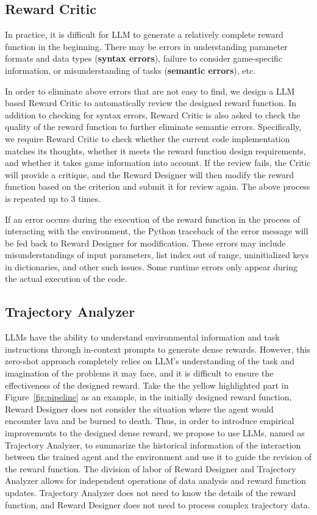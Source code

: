 \subsection{Reward Critic}
In practice, it is difficult for LLM to generate a relatively complete reward function in the beginning. There may be errors in understanding parameter formats and data types (\textbf{syntax errors}), failure to consider game-specific information, or misunderstanding of tasks (\textbf{semantic errors}), etc. 

In order to eliminate above errors that are not easy to find, we design a LLM based Reward Critic to automatically review the designed reward function. In addition to checking for syntax errors, Reward Critic is also asked to check the quality of the reward function to further eliminate semantic errors. Specifically, we require Reward Critic to check whether the current code implementation matches its thoughts, whether it meets the reward function design requirements, and whether it takes game information into account. If the review fails, the Critic will provide a critique, and the Reward Designer will then modify the reward function based on the criterion and submit it for review again. The above process is repeated up to 3 times.

If an error occurs during the execution of the reward function in the process of interacting with the environment, the Python traceback of the error message will be fed back to Reward Designer for modification. These errors may include misunderstandings of input parameters, list index out of range, uninitialized keys in dictionaries, and other such issues. Some runtime errors only appear during the actual execution of the code.


\subsection{Trajectory Analyzer}\label{sec:trajectory_analyzer}
LLMs have the ability to understand environmental information and task instructions through in-context prompts to generate dense rewards. However, this zero-shot approach completely relies on LLM’s understanding of the task and imagination of the problems it may face, and it is difficult to ensure the effectiveness of the designed reward. Take the the yellow highlighted part in Figure~\ref{fig:pipeline} as an example, in the initially designed reward function, Reward Designer does not consider the situation where the agent would encounter lava and be burned to death. Thus, in order to introduce empirical improvements to the designed dense reward, we propose to use LLMs, named as Trajectory Analyzer, to summarize the historical information of the interaction between the trained agent and the environment and use it to guide the revision of the reward function. The division of labor of Reward Designer and Trajectory Analyzer allows for independent operations of data analysis and reward function updates. Trajectory Analyzer does not need to know the details of the reward function, and Reward Designer does not need to process complex trajectory data.

